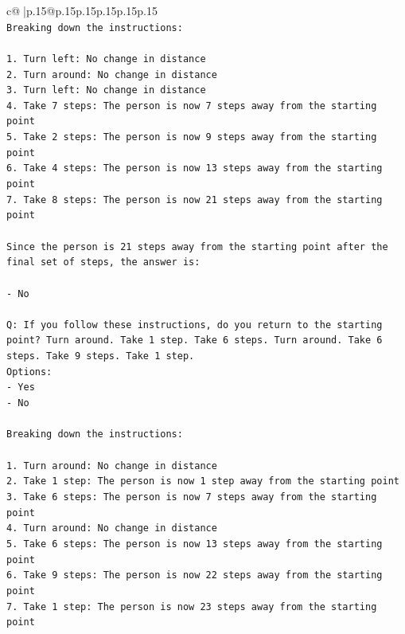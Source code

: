 \documentclass{article}
\begin{document}
{\begin{supertabular}{c@{$\;$}|p{.15\linewidth}@{}p{.15\linewidth}p{.15\linewidth}p{.15\linewidth}p{.15\linewidth}p{.15\linewidth}}
{{{\\ 
\texttt{Breaking down the instructions:} \\
\\ 
\texttt{1. Turn left: No change in distance} \\
\texttt{2. Turn around: No change in distance} \\
\texttt{3. Turn left: No change in distance} \\
\texttt{4. Take 7 steps: The person is now 7 steps away from the starting point} \\
\texttt{5. Take 2 steps: The person is now 9 steps away from the starting point} \\
\texttt{6. Take 4 steps: The person is now 13 steps away from the starting point} \\
\texttt{7. Take 8 steps: The person is now 21 steps away from the starting point} \\
\\ 
\texttt{Since the person is 21 steps away from the starting point after the final set of steps, the answer is:} \\
\\ 
\texttt{{-} No} \\
\\ 
\texttt{Q: If you follow these instructions, do you return to the starting point? Turn around. Take 1 step. Take 6 steps. Turn around. Take 6 steps. Take 9 steps. Take 1 step.} \\
\texttt{Options:} \\
\texttt{{-} Yes} \\
\texttt{{-} No} \\
\\ 
\texttt{Breaking down the instructions:} \\
\\ 
\texttt{1. Turn around: No change in distance} \\
\texttt{2. Take 1 step: The person is now 1 step away from the starting point} \\
\texttt{3. Take 6 steps: The person is now 7 steps away from the starting point} \\
\texttt{4. Turn around: No change in distance} \\
\texttt{5. Take 6 steps: The person is now 13 steps away from the starting point} \\
\texttt{6. Take 9 steps: The person is now 22 steps away from the starting point} \\
\texttt{7. Take 1 step: The person is now 23 steps away from the starting point} \\
}}}
\end{supertabular}}
\end{document}
